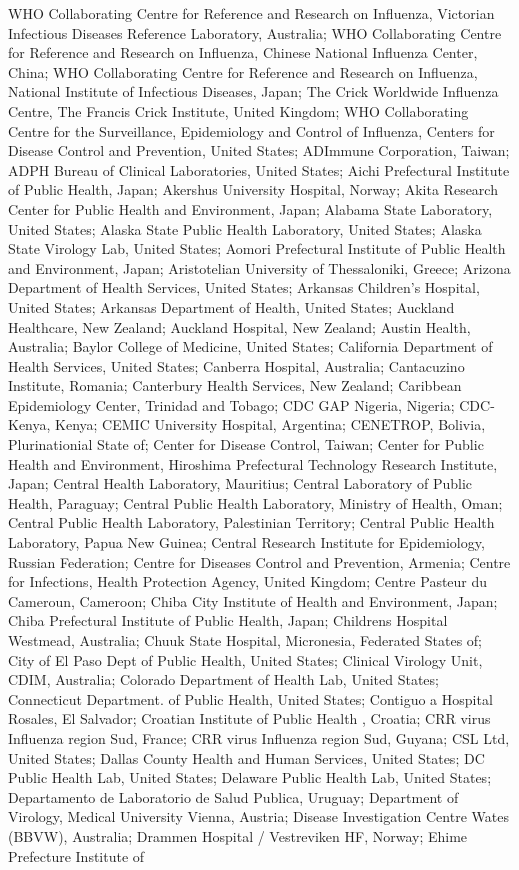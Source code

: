 \documentclass[9pt,lineno]{elife} %
\providecommand{\DIFdelend}{} %
\providecommand{\DIFdelend}{} %
\DeclareRobustCommand{\DIFdelend}{\DIFOaddend \let\includegraphics\DIFOincludegraphics} %
\begin{document}
\begin{appendixbox}
\DIFdelend WHO Collaborating Centre for Reference and Research on Influenza, Victorian Infectious Diseases Reference Laboratory, Australia; WHO Collaborating Centre for Reference and Research on Influenza, Chinese National Influenza Center, China; WHO Collaborating Centre for Reference and Research on Influenza, National Institute of Infectious Diseases, Japan; The Crick Worldwide Influenza Centre, The Francis Crick Institute, United Kingdom; WHO Collaborating Centre for the Surveillance, Epidemiology and Control of Influenza, Centers for Disease Control and Prevention, United States; ADImmune Corporation, Taiwan; ADPH Bureau of Clinical Laboratories, United States; Aichi Prefectural Institute of Public Health, Japan; Akershus University Hospital, Norway; Akita Research Center for Public Health and Environment, Japan; Alabama State Laboratory, United States; Alaska State Public Health Laboratory, United States; Alaska State Virology Lab, United States; Aomori Prefectural Institute of Public Health and Environment, Japan; Aristotelian University of Thessaloniki, Greece; Arizona Department of Health Services, United States; Arkansas Children's Hospital, United States; Arkansas Department of Health, United States; Auckland Healthcare, New Zealand; Auckland Hospital, New Zealand; Austin Health, Australia; Baylor College of Medicine, United States; California Department of Health Services, United States; Canberra Hospital, Australia; Cantacuzino Institute, Romania; Canterbury Health Services, New Zealand; Caribbean Epidemiology Center, Trinidad and Tobago; CDC GAP Nigeria, Nigeria; CDC-Kenya, Kenya; CEMIC University Hospital, Argentina; CENETROP, Bolivia, Plurinationial State of; Center for Disease Control, Taiwan; Center for Public Health and Environment, Hiroshima Prefectural Technology Research Institute, Japan; Central Health Laboratory, Mauritius; Central Laboratory of Public Health, Paraguay; Central Public Health Laboratory, Ministry of Health, Oman; Central Public Health Laboratory, Palestinian Territory; Central Public Health Laboratory, Papua New Guinea; Central Research Institute for Epidemiology, Russian Federation; Centre for Diseases Control and Prevention, Armenia; Centre for Infections, Health Protection Agency, United Kingdom; Centre Pasteur du Cameroun, Cameroon; Chiba City Institute of Health and Environment, Japan; Chiba Prefectural Institute of Public Health, Japan; Childrens Hospital Westmead, Australia; Chuuk State Hospital, Micronesia, Federated States of; City of El Paso Dept of Public Health, United States; Clinical Virology Unit, CDIM, Australia; Colorado Department of Health Lab, United States; Connecticut Department. of Public Health, United States; Contiguo a Hospital Rosales, El Salvador; Croatian Institute of Public Health , Croatia; CRR virus Influenza region Sud, France; CRR virus Influenza region Sud, Guyana; CSL Ltd, United States; Dallas County Health and Human Services, United States; DC Public Health Lab, United States; Delaware Public Health Lab, United States; Departamento de Laboratorio de Salud Publica, Uruguay; Department of Virology, Medical University Vienna, Austria; Disease Investigation Centre Wates (BBVW), Australia; Drammen Hospital / Vestreviken HF, Norway; Ehime Prefecture Institute of 
\end{appendixbox}
\end{document}
